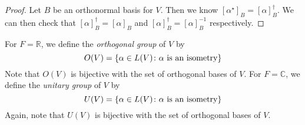\begin{proof}
	Let \( B \) be an orthonormal basis for \( V \).
	Then we know \( [\alpha^\star]_B = [\alpha]_B^\dagger \).
	We can then check that \( [\alpha]_B^\dagger = [\alpha]_B \) and \( [\alpha]_B^\dagger = [\alpha]_B^{-1} \) respectively.
\end{proof}
\begin{definition}
	For \( F = \mathbb R \), we define the \textit{orthogonal group} of \( V \) by
	\[
		O(V) = \qty{ \alpha \in L(V) \colon \alpha \text{ is an isometry} }
	\]
	Note that \( O(V) \) is bijective with the set of orthogonal bases of \( V \).
	For \( F = \mathbb C \), we define the \textit{unitary group} of \( V \) by
	\[
		U(V) = \qty{ \alpha \in L(V) \colon \alpha \text{ is an isometry} }
	\]
	Again, note that \( U(V) \) is bijective with the set of orthogonal bases of \( V \).
\end{definition}

